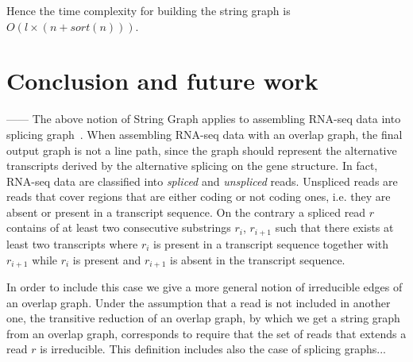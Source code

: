 \documentclass[runningheads,envcountsame,a4paper]{llncs}
\begin{document}
Hence the time complexity for building the string graph is
$O(l \times (n + sort(n)))$.



\section{Conclusion and future work}
------
The above notion of String Graph applies to assembling RNA-seq data into
splicing graph~\cite{Beretta2013}.
When assembling RNA-seq data with an overlap graph, the final output
graph is not a line path, since the graph should represent the
alternative transcripts derived by the alternative splicing on the gene
structure.
In fact, RNA-seq data are classified into \emph{spliced} and
\emph{unspliced} reads.
Unspliced reads are reads that cover regions that are either coding or
not coding ones, i.e. they are absent or present in a transcript
sequence.
On the contrary a spliced read $r$ contains of at least two consecutive
substrings $r_i $, $r_{i+1}$ such that there exists at least two
transcripts where $r_i$ is present in a transcript sequence together
with $r_{i+1}$ while $r_i$ is present and $r_{i+1}$ is absent in the
transcript sequence.

In order to include this case we give a more general notion of
irreducible edges of an overlap graph.
Under the assumption that a read is not included in another one, the
transitive reduction of an overlap graph, by which we get a string graph
from an overlap graph, corresponds to require that the set of reads that
extends a read $r$ is irreducible.
This definition includes also the case of splicing graphs...



\end{document}
